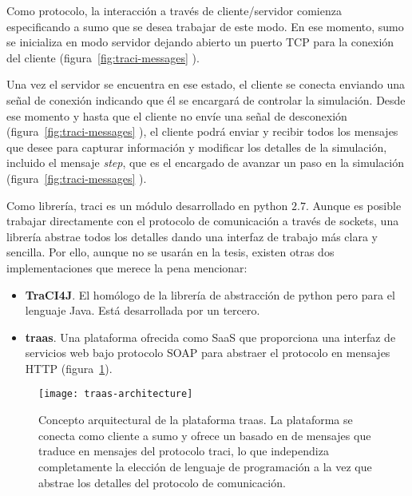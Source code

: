 Como protocolo, la interacción a través de cliente/servidor comienza especificando a \gls{sumo} que se desea trabajar de este modo. En ese momento, \gls{sumo} se inicializa en modo servidor dejando abierto un puerto TCP para la conexión del cliente (figura~\ref{fig:traci-messages} ).

Una vez el servidor se encuentra en ese estado, el cliente se conecta enviando una señal de conexión indicando que él se encargará de controlar la simulación. Desde ese momento y hasta que el cliente no envíe una señal de desconexión (figura~\ref{fig:traci-messages} ), el cliente podrá enviar y recibir todos los mensajes que desee para capturar información y modificar los detalles de la simulación, incluido el mensaje \textit{step}, que es el encargado de avanzar un paso en la simulación (figura~\ref{fig:traci-messages} ).

Como librería, \gls{traci} es un módulo desarrollado en \gls{python} $2$.$7$. Aunque es posible trabajar directamente con el protocolo de comunicación a través de sockets, una librería abstrae todos los detalles dando una interfaz de trabajo más clara y sencilla. Por ello, aunque no se usarán en la tesis, existen otras dos implementaciones que merece la pena mencionar:

\begin{itemize}
	\item \textbf{TraCI4J}. El homólogo de la librería de abstracción de \gls{python} pero para el lenguaje Java. Está desarrollada por un tercero.
	\item \textbf{\gls{traas}}. Una plataforma ofrecida como SaaS que proporciona una interfaz de servicios web bajo protocolo SOAP para abstraer el protocolo en mensajes HTTP (figura~\ref{fig:traas}).
\end{itemize}

\begin{figure}
	\centering
	\texttt{[image: traas-architecture]}
	\caption[Arquitectura de la plataforma \gls{traas}]{Concepto arquitectural de la plataforma \gls{traas}. La plataforma se conecta como cliente a \gls{sumo} y ofrece un  basado en  de mensajes que traduce en mensajes del protocolo \gls{traci}, lo que independiza completamente la elección de lenguaje de programación a la vez que abstrae los detalles del protocolo de comunicación.}
	\label{fig:traas}
\end{figure}
